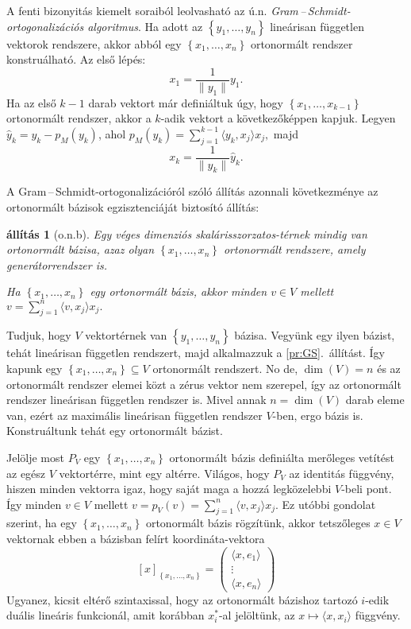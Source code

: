 \documentclass[9pt, a4paper, showtrims]{memoir}
\makeatletter
\renewenvironment{proof}[1][\proofname]
    {\par\pushQED{\qed}%
    \normalfont \topsep6\p@\@plus6\p@\relax
    \trivlist
    \item[\hskip\labelsep
        \itshape
    #1\@addpunct{:}]\ignorespaces}
    {\popQED\endtrivlist\@endpefalse}
\theoremstyle{plain}
\newtheorem{proposition}{állítás}[chapter]
\theoremstyle{remark}
\theoremstyle{definition}
\newcommand{\ip}[2]{\langle#1,#2\rangle}
\makeatother
\begin{document}
A fenti bizonyitás kiemelt soraiból leolvasható az ú.n. \emph{Gram\,--\,Schmidt-ortogonalizációs algoritmus}.
Ha adott az $\left\{ y_1,\ldots,y_n \right\}$ lineárisan független vektorok rendszere, akkor abból egy
$\left\{ x_1,\ldots,x_n \right\}$ ortonormált rendszer konstruálható.
Az első lépés:
\[
	x_1=\frac{1}{\|y_1\|}y_1.
\]
Ha az első $k-1$ darab vektort már definiáltuk úgy, hogy $\left\{ x_1,\ldots,x_{k-1} \right\}$ ortonormált rendszer,
akkor a $k$-adik vektort a következőképpen kapjuk.
Legyen $\hat{y}_k=y_k-p_M\left( y_k \right)$,
ahol
$p_M\left( y_k \right)=\sum_{j=1}^{k-1}\ip{y_k}{x_j}x_j,$
majd
\[
	x_k=\frac{1}{\|\hat{y}_k\|}\hat{y}_k.
\]

A Gram\,--\,Schmidt-ortogonalizációról szóló állítás azonnali következménye az ortonormált bázisok egzisztenciáját biztosító állítás:
\begin{proposition}[o.n.b]\label{pr:onb}
	Egy véges dimenziós skalárisszorzatos-térnek mindig van ortonormált bázisa, azaz olyan $\left\{ x_1,\ldots,x_n \right\}$ ortonormált
	rendszere, amely generátorrendszer is.

	Ha $\left\{ x_1,\ldots,x_n \right\}$ egy ortonormált bázis, akkor minden $v\in V$ mellett
	\(
	v=
	\sum_{j=1}^n\ip{v}{x_j}x_j.
	\)
\end{proposition}
\begin{proof}
	Tudjuk, hogy $V$ vektortérnek van $\left\{ y_1,\ldots,y_n \right\}$ bázisa.
	Vegyünk egy ilyen bázist, tehát lineárisan független rendszert, majd alkalmazzuk a \ref{pr:GS}.~állítást.
	Így kapunk egy
	\begin{math}
		\left\{ x_1,\ldots,x_n \right\}\subseteq V
	\end{math}
	ortonormált rendszert.
	No de, $\dim(V)=n$ és az ortonormált rendszer elemei közt a zérus vektor nem szerepel,
	így az ortonormált rendszer lineárisan független rendszer is.
	Mivel annak $n=\dim(V)$ darab eleme van,
	ezért az maximális lineárisan független rendszer $V$-ben, ergo bázis is.
	Konstruáltunk tehát egy ortonormált bázist.

	Jelölje most $P_V$ egy $\left\{ x_1,\ldots,x_n \right\}$
	ortonormált bázis definiálta merőleges vetítést az egész $V$ vektortérre, mint egy altérre.
	Világos, hogy $P_V$ az identitás függvény,
	hiszen minden vektorra igaz, hogy saját maga a hozzá legközelebbi $V$-beli pont.
	Így minden $v\in V$ mellett $v=p_V\left( v \right)=\sum_{j=1}^n\ip{v}{x_j}x_j.$
\end{proof}
Ez utóbbi gondolat szerint,
ha egy $\left\{ x_1,\ldots,x_n \right\}$ ortonormált bázis rögzítünk,
akkor tetszőleges $x\in V$ vektornak ebben a bázisban felírt koordináta-vektora
\[
	[x]_{\left\{x_1,\ldots,x_n\right\}}
	=
	\begin{pmatrix}
		\ip{x}{e_1} \\ \vdots \\\ip{x}{e_n}
	\end{pmatrix}
\]
Ugyanez, kicsit eltérő szintaxissal, hogy az ortonormált bázishoz tartozó
$i$-edik duális lineáris funkcionál,
amit korábban $x_i^\ast$-al jelöltünk, az $x\mapsto\ip{x}{x_i}$
függvény.
\end{document}
